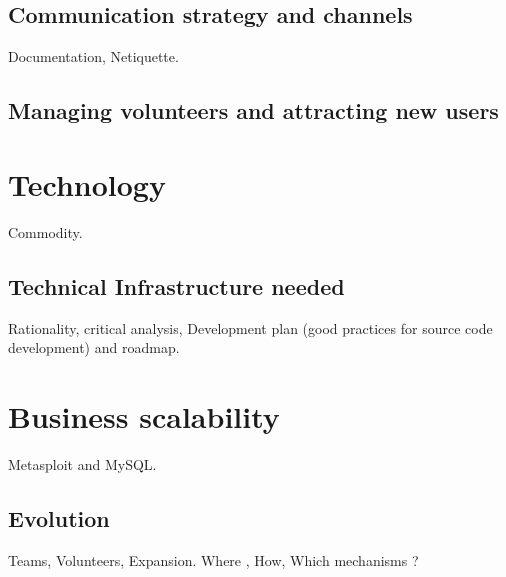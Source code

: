 \documentclass[11pt]{scrartcl}
\begin{document}

\subsection{Communication strategy and channels}
\label{sub:communication-strategy}

\par Documentation, Netiquette.


\subsection{Managing volunteers and attracting new users}
\label{sub:volunteers-users}


\section{Technology}
\label{sec:technology}

\par Commodity.


\subsection{Technical Infrastructure needed}
\label{sub:infrastructure}

\par Rationality, critical analysis, Development plan (good practices for source code development) and roadmap.


\section{Business scalability}
\label{sec:scalability}

\par Metasploit and MySQL.


\subsection{Evolution}
\label{sub:evolution}

\par Teams, Volunteers, Expansion. Where , How, Which mechanisms ?
\end{document}
